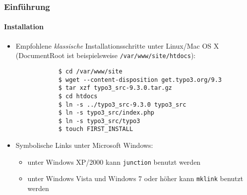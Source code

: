 \begin{frame}[fragile]
	\frametitle{Einführung}
	\framesubtitle{Installation}

	\begin{itemize}
		\item Empfohlene \textit{klassische} Installationsschritte unter Linux/Mac OS X\newline
			(DocumentRoot ist beispielsweise \texttt{/var/www/site/htdocs}):
		\begin{lstlisting}
			$ cd /var/www/site
			$ wget --content-disposition get.typo3.org/9.3
			$ tar xzf typo3_src-9.3.0.tar.gz
			$ cd htdocs
			$ ln -s ../typo3_src-9.3.0 typo3_src
			$ ln -s typo3_src/index.php
			$ ln -s typo3_src/typo3
			$ touch FIRST_INSTALL
		\end{lstlisting}

		\item Symbolische Links unter Microsoft Windows:

			\begin{itemize}
				\item unter Windows XP/2000 kann \texttt{junction} benutzt werden
				\item unter Windows Vista und Windows 7 oder höher kann \texttt{mklink} benutzt werden
			\end{itemize}

	\end{itemize}
\end{frame}

